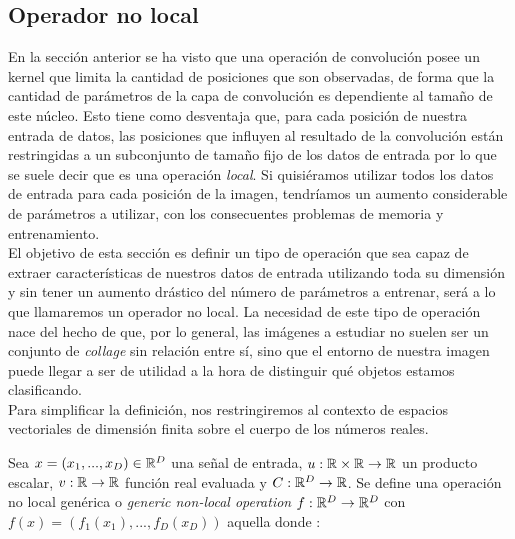\begin{itemize}


\chapter{Operador no local}\label{def:non-local}
En la sección anterior se ha visto que una operación de convolución posee un kernel que limita la cantidad de posiciones que son observadas, de forma que la cantidad de parámetros de la capa de convolución es dependiente al tamaño de este núcleo. Esto tiene como desventaja que, para cada posición de nuestra entrada de datos, las posiciones que influyen al resultado de la convolución están restringidas a un subconjunto de tamaño fijo de los datos de entrada por lo que se suele decir que es una operación \emph{local}. Si quisiéramos utilizar todos los datos de entrada para cada posición de la imagen, tendríamos un aumento considerable de parámetros a utilizar, con los consecuentes problemas de memoria y entrenamiento.\\

El objetivo de esta sección es definir un tipo de operación que sea capaz de extraer características de nuestros datos de entrada utilizando toda su dimensión y sin tener un aumento drástico del número de parámetros a entrenar, será a lo que llamaremos un operador no local. La necesidad de este tipo de operación nace del hecho de que, por lo general, las imágenes a estudiar no suelen ser un conjunto de \emph{collage} sin relación entre sí, sino que el entorno de nuestra imagen puede llegar a ser de utilidad a la hora de distinguir qué objetos estamos clasificando.\\

Para simplificar la definición, nos restringiremos al contexto de espacios vectoriales de dimensión finita sobre el cuerpo de los números reales.
\begin{definicion}
 Sea $x=(x_1,...,x_D)\in \mathbb{R}^D$ una señal de entrada, $u:\mathbb{R} \times \mathbb{R} \to \mathbb{R}$ un producto escalar, $v:\mathbb{R} \to \mathbb{R}$ función real evaluada y $C:\mathbb{R}^D \to \mathbb{R}$.  Se define una operación no local genérica o \emph{generic non-local operation} $f:\mathbb{R}^D \to \mathbb{R}^D$ con $f(x)=(f_1(x_1),...,f_D(x_D))$ aquella donde \cite{DBLP:journals/corr/abs-1711-07971}:


\end{definicion}
\end{itemize}
